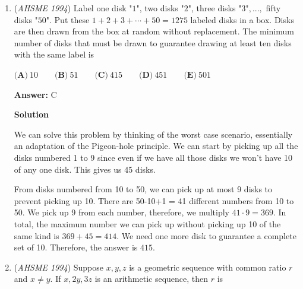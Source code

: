 \begin{enumerate}
$\textbf{(A)}\ 5 \qquad\textbf{(B)}\ 7 \qquad\textbf{(C)}\ 9 \qquad\textbf{(D)}\ 15 \qquad\textbf{(E)}\ 18$

 \textbf{Answer: }C



\textbf{Solution}

We solve for $\angle A$ as follows: 
 \[4\angle A+4\angle A+\angle A=180\implies 9\angle A=180\implies \angle A=20^\circ.\] That means that minor arc $\widehat{BC}$ has measure $40^\circ$. We can fit a maximum of $\frac{360}{40}=\boxed{\textbf{(C) }9}$ of these arcs in the circle.

 --Solution by \href{https://artofproblemsolving.comhttp://www.artofproblemsolving.com/Forum/memberlist.php?mode=viewprofile&u=200685}{TheMaskedMagician}

 


	\item (\textit{AHSME 1994}) Label one disk "$1$", two disks "$2$", three disks "$3$"$, ...,$ fifty disks "$50$". Put these $1+2+3+ \cdots+50=1275$ labeled disks in a box. Disks are then drawn from the box at random without replacement. The minimum number of disks that must be drawn to guarantee drawing at least ten disks with the same label is


 $\textbf{(A)}\ 10 \qquad\textbf{(B)}\ 51 \qquad\textbf{(C)}\ 415 \qquad\textbf{(D)}\ 451 \qquad\textbf{(E)}\ 501$

 \textbf{Answer: }C



\textbf{Solution}

We can solve this problem by thinking of the worst case scenario, essentially an adaptation of the Pigeon-hole principle. We can start by picking up all the disks numbered 1 to 9 since even if we have all those disks we won't have 10 of any one disk. This gives us 45 disks. 

 From disks numbered from 10 to 50, we can pick up at most 9 disks to prevent picking up 10. There are 50-10+1 = 41 different numbers from 10 to 50. We pick up 9 from each number, therefore, we multiply $41 \cdot 9 = 369$. In total, the maximum number we can pick up without picking up 10 of the same kind is $369+45=414$. We need one more disk to guarantee a complete set of 10. Therefore, the answer is $\boxed{415}$.

 


	\item (\textit{AHSME 1994}) Suppose $x,y,z$ is a geometric sequence with common ratio $r$ and $x \neq y$. If $x, 2y, 3z$ is an arithmetic sequence, then $r$ is



\end{enumerate}

